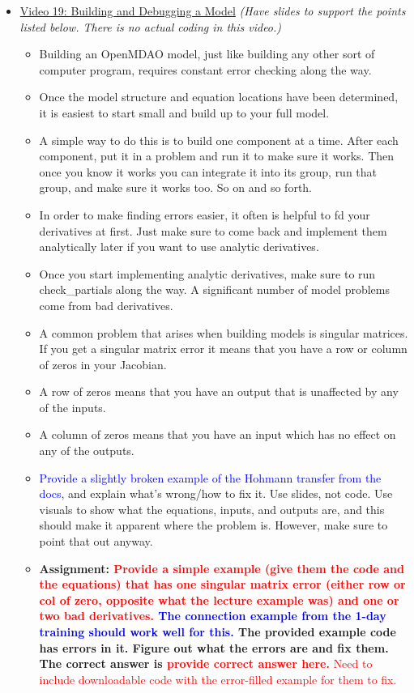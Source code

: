 \documentclass[12pt, letterpaper]{article}
\begin{document}
\begin{itemize}
	\item \underline{Video 19: Building and Debugging a Model} \textit{(Have slides to support the points listed below. There is no  actual coding in this video.)}
		\begin{itemize}
			\item Building an OpenMDAO model, just like building any other sort of computer program, requires constant error checking along the way.
			\item Once the model structure and equation locations have been determined, it is easiest to start small and build up to your full model.
			\item A simple way to do this is to build one component at a time. After each component, put it in a problem and run it to make sure it works. Then once you know it works you can integrate it into its group, run that group, and make sure it works too. So on and so forth.
			\item In order to make finding errors easier, it often is helpful to fd your derivatives at first. Just make sure to come back and implement them analytically later if you want to use analytic derivatives.
			\item Once you start implementing analytic derivatives, make sure to run check\_partials along the way. A significant number of model problems come from bad derivatives.
			\item A common problem that arises when building models is singular matrices. If you get a singular matrix error it means that you have a row or column of zeros in your Jacobian.
			\item A row of zeros means that you have an output that is unaffected by any of the inputs.
			\item A column of zeros means that you have an input which has no effect on any of the outputs.
			\item \textcolor{blue}{Provide a slightly broken example of the Hohmann transfer from the docs}, and explain what’s wrong/how to fix it. Use slides, not code. Use visuals to show what the equations, inputs, and outputs are, and this should make it apparent where the problem is. However, make sure to point that out anyway.
			\item \textbf{Assignment: \textcolor{red}{Provide a simple example (give them the code and the equations) that has one singular matrix error (either row or col of zero, opposite what the lecture example was) and one or two bad derivatives.} \textcolor{blue}{The connection example from the 1-day training should work well for this.} The provided example code has errors in it. Figure out what the errors are and fix them. The correct answer is \textcolor{red}{provide correct answer here.}} \textcolor{red}{Need to include downloadable code with the error-filled example for them to fix.}
		\end{itemize}
		

\end{itemize}
\end{document}
